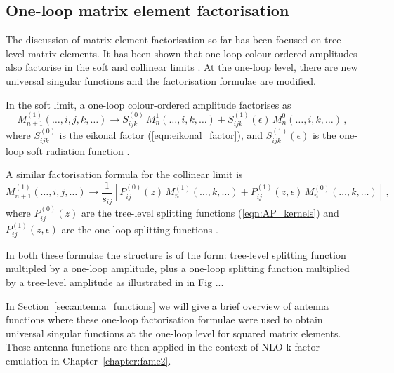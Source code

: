 \documentclass[main.tex]{subfiles}
\begin{document}
\subsection{One-loop matrix element factorisation}\label{sec:OL_factorisation}
    The discussion of matrix element factorisation so
    far has been focused on tree-level matrix elements.
    It has been shown that one-loop colour-ordered amplitudes
    also factorise in the soft and collinear limits \cite{Bern:1994zx,Bern:1998sc,Kosower:1999xi}.
    At the one-loop level, there are new universal singular
    functions and the factorisation formulae are modified.

    In the soft limit, a one-loop colour-ordered amplitude
    factorises as
    \begin{equation}\label{eqn:1L_soft_factorisation}
        M_{n+1}^{(1)}(\ldots, i, j, k, \ldots) \rightarrow S_{ijk}^{(0)} \, M_{n}^{1}(\ldots, i, k, \ldots) + S_{ijk}^{(1)}(\epsilon) \, M_{n}^{0}(\ldots, i, k, \ldots) \, ,
    \end{equation}
    where $S_{ijk}^{(0)}$ is the eikonal factor (\ref{eqn:eikonal_factor}),
    and $S_{ijk}^{(1)}(\epsilon)$ is the one-loop soft radiation function \cite{Bern:1999ry}.

    A similar factorisation formula for the collinear limit is
    \begin{equation}\label{eqn:1L_collinear_factorisation}
        M_{n+1}^{(1)}(\ldots, i, j, \ldots) \rightarrow \dfrac{1}{s_{ij}} \left[ P_{ij}^{(0)}(z) \, M_{n}^{(1)}(\ldots, k, \ldots) + P_{ij}^{(1)}(z, \epsilon) \, M_{n}^{(0)}(\ldots, k, \ldots) \right] \, ,
    \end{equation}
    where $P_{ij}^{(0)}(z)$ are the tree-level splitting functions
    (\ref{eqn:AP_kernels}) and $P_{ij}^{(1)}(z, \epsilon)$
    are the one-loop splitting functions \cite{Bern:1999ry}.

    In both these formulae the structure is of the form:
    tree-level splitting function multipled by a one-loop
    amplitude, plus a one-loop splitting function multiplied
    by a tree-level amplitude as illustrated in in Fig ...

    In Section~\ref{sec:antenna_functions} we will give
    a brief overview of antenna functions where these one-loop
    factorisation formulae were used to obtain universal singular functions
    at the one-loop level for squared matrix elements. These
    antenna functions are then applied in the context of NLO
    k-factor emulation in Chapter~\ref{chapter:fame2}.
\end{document}
